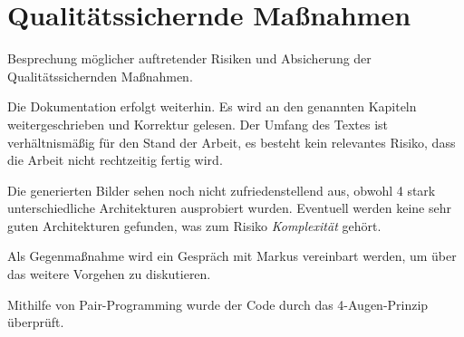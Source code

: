 \section{Qualitätssichernde Maßnahmen}
Besprechung möglicher auftretender Risiken und Absicherung der Qualitätssichernden Maßnahmen.
\begin{description}[style=nextline]
	\item[Review und Dokumentation \hfill \fullcheck]
	Die Dokumentation erfolgt weiterhin.
	Es wird an den genannten Kapiteln weitergeschrieben und Korrektur gelesen.
	Der Umfang des Textes ist verhältnismäßig für den Stand der Arbeit, es besteht kein relevantes Risiko, dass die Arbeit nicht rechtzeitig fertig wird.
	
	\item[Risikoanalyse \hfill \fullcheck]
	Die generierten Bilder sehen noch nicht zufriedenstellend aus, obwohl 4 stark unterschiedliche Architekturen ausprobiert wurden.
	Eventuell werden keine sehr guten Architekturen gefunden, was zum Risiko \textit{Komplexität} gehört.
	
	Als Gegenmaßnahme wird ein Gespräch mit Markus vereinbart werden, um über das weitere Vorgehen zu diskutieren.
	
	\item[Pair-Programming \hfill \fullcheck]
	Mithilfe von Pair-Programming wurde der Code durch das 4-Augen-Prinzip überprüft.
	
	
\end{description}

